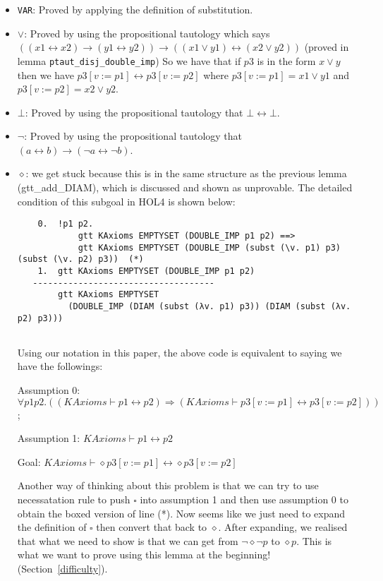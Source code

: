 \documentclass[submission,copyright,creativecommons]{eptcs}
\begin{document}
\begin{itemize}
  \item \texttt{VAR}: Proved by applying the definition of substitution.
  \item $\vee$: Proved by using the propositional tautology which says 
  $((x1 \leftrightarrow x2) \rightarrow (y1 \leftrightarrow y2)) \rightarrow ((x1 \vee y1)\leftrightarrow(x2 \vee y2)) $ (proved in lemma \texttt{ptaut\_disj\_double\_imp})
  So we have that if $p3$ is in the form $x \vee y$ then we have 
  $p3[v:=p1] \leftrightarrow p3[v:=p2]$ where $p3[v:=p1] = x1 \vee y1$ and $p3[v:=p2] = x2 \vee y2$.
  \item $\bot$: Proved by using the propositional tautology that $\bot \leftrightarrow \bot$.
  \item $\neg$: Proved by using the propositional tautology that $(a \leftrightarrow b)
  \rightarrow (\neg a \leftrightarrow \neg b)$.
  \item $\diamond$: we get stuck because this is in the same structure as the previous lemma
  (gtt\_add\_DIAM), which is discussed and shown as unprovable. The detailed condition of this 
  subgoal in HOL4 is shown below:
  \begin{verbatim}
    0.  !p1 p2.
            gtt KAxioms EMPTYSET (DOUBLE_IMP p1 p2) ==>
            gtt KAxioms EMPTYSET (DOUBLE_IMP (subst (\v. p1) p3) (subst (\v. p2) p3))  (*)
    1.  gtt KAxioms EMPTYSET (DOUBLE_IMP p1 p2)
   ------------------------------------
        gtt KAxioms EMPTYSET
          (DOUBLE_IMP (DIAM (subst (λv. p1) p3)) (DIAM (subst (λv. p2) p3)))
   
  \end{verbatim}

  Using our notation in this paper, the above code is equivalent to saying we have the followings:

  Assumption 0: $\forall p1 p2. 
              ((KAxioms \vdash p1 \leftrightarrow p2) \Rightarrow (KAxioms \vdash p3[v:=p1]\leftrightarrow p3[v:=p2]))$;

  Assumption 1: $KAxioms \vdash p1 \leftrightarrow p2$

  Goal: $KAxioms \vdash \diamond p3[v:=p1] \leftrightarrow \diamond p3[v:=p2]$


  Another way of thinking 
  about this problem is that we can try to use necessatation rule to push $\square$
  into assumption 1 and then use assumption 0 to obtain the boxed version of 
  line (*). Now seems like we just need to expand the definition of $\square$ then convert that 
  back to $\diamond$. After expanding, we realised that what we need to show is that 
  we can get from $\neg \diamond \neg p$ to $\diamond p$. This is what we want to prove 
  using this lemma at the beginning!(Section~\ref{difficulty}).
\end{itemize}
\end{document}

